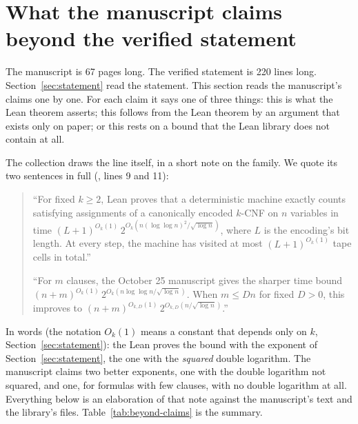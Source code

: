 \section{What the manuscript claims beyond the verified statement}
\label{sec:beyond}

The manuscript \citep{OAI:The-Exponential-Time-Hypothesis-is-False-October-25-2026}
is 67 pages long. The verified statement is 220 lines long. Section~\ref{sec:statement}
read the statement. This section reads the manuscript's claims one by
one. For each claim it says one of three things: this is what the Lean
theorem asserts; this follows from the Lean theorem by an argument that
exists only on paper; or this rests on a bound that the Lean library
does not contain at all.

The collection draws the line itself, in a short note on the family.
We quote its two sentences in full (, lines
9 and 11):
\begin{quote}\small\sloppy
``For fixed $k \ge 2$, Lean proves that a deterministic machine exactly
counts satisfying assignments of a canonically encoded $k$-CNF on $n$
variables in time $(L+1)^{O_k(1)}\,2^{O_k(n(\log\log n)^2/\sqrt{\log n})}$,
where $L$ is the encoding's bit length. At every step, the machine has
visited at most $(L+1)^{O_k(1)}$ tape cells in total.''

``For $m$ clauses, the October 25 manuscript gives the sharper time bound
$(n+m)^{O_k(1)}\,2^{O_k(n\log\log n/\sqrt{\log n})}$. When $m \le Dn$ for
fixed $D > 0$, this improves to
$(n+m)^{O_{k,D}(1)}\,2^{O_{k,D}(n/\sqrt{\log n})}$.''
\end{quote}
In words (the notation $O_k(1)$ means a constant that depends only on $k$, Section~\ref{sec:statement}): the Lean proves the bound with the exponent of Section~\ref{sec:statement}, the one with the \emph{squared} double logarithm. The manuscript claims two better exponents, one with the
double logarithm not squared, and one, for formulas with few clauses,
with no double logarithm at all. Everything below is an elaboration of
that note against the manuscript's text and the library's files.
Table~\ref{tab:beyond-claims} is the summary.

